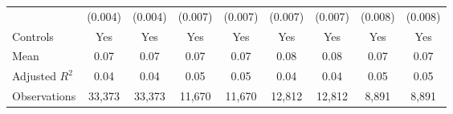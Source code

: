 {\begin{tabular}{l*{8}{c}}
                    &     (0.004)         &     (0.004)         &     (0.007)         &     (0.007)         &     (0.007)         &     (0.007)         &     (0.008)         &     (0.008)         \\
Controls            &         Yes         &         Yes         &         Yes         &         Yes         &         Yes         &         Yes         &         Yes         &         Yes         \\
\hline
Mean                &        0.07         &        0.07         &        0.07         &        0.07         &        0.08         &        0.08         &        0.07         &        0.07         \\
Adjusted \(R^{2}\)  &        0.04         &        0.04         &        0.05         &        0.05         &        0.04         &        0.04         &        0.05         &        0.05         \\
Observations        &      33,373         &      33,373         &      11,670         &      11,670         &      12,812         &      12,812         &       8,891         &       8,891         \\
\hline\hline
\end{tabular}
}
